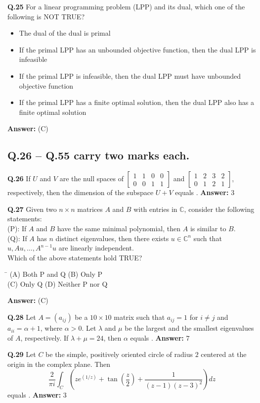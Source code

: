 \documentclass[11pt,a4paper]{article}
\newcommand{\optsfourA}[4]{%
  \begin{tabbing}
    \hspace{0.48\linewidth}\=\kill
    (A) #1 \> (B) #2 \\[2pt]
    (C) #3 \> (D) #4
  \end{tabbing}%
}
\newcommand{\optslistA}[4]{%
  \begin{itemize}
    \setlength{\itemsep}{2pt}\setlength{\parskip}{0pt}
    \item[(A)] #1
    \item[(B)] #2
    \item[(C)] #3
    \item[(D)] #4
  \end{itemize}%
}
\newcommand{\ans}[1]{\textbf{Answer:} #1\par\medskip}
\begin{document}
\textbf{Q.25} For a linear programming problem (LPP) and its dual, which one of the following is NOT TRUE?
\optslistA{The dual of the dual is primal}{If the primal LPP has an unbounded objective function, then the dual LPP is infeasible}{If the primal LPP is infeasible, then the dual LPP must have unbounded objective function}{If the primal LPP has a finite optimal solution, then the dual LPP also has a finite optimal solution}
\ans{(C)}

\subsection*{Q.26 -- Q.55 carry two marks each.}

\textbf{Q.26} If $U$ and $V$ are the null spaces of $\begin{bmatrix} 1 & 1 & 0 & 0 \\ 0 & 0 & 1 & 1 \end{bmatrix}$ and $\begin{bmatrix} 1 & 2 & 3 & 2 \\ 0 & 1 & 2 & 1 \end{bmatrix}$, respectively, then the dimension of the subspace $U + V$ equals \underline{\hspace{2cm}}.
\ans{$3$}

\textbf{Q.27} Given two $n \times n$ matrices $A$ and $B$ with entries in $\mathbb{C}$, consider the following statements:\\
(P): If $A$ and $B$ have the same minimal polynomial, then $A$ is similar to $B$.\\
(Q): If $A$ has $n$ distinct eigenvalues, then there exists $u \in \mathbb{C}^n$ such that $u, Au, \dots, A^{n-1}u$ are linearly independent.\\
Which of the above statements hold TRUE?
\optsfourA{Both P and Q}{Only P}{Only Q}{Neither P nor Q}
\ans{(C)}

\textbf{Q.28} Let $A = (a_{ij})$ be a $10 \times 10$ matrix such that $a_{ij} = 1$ for $i \neq j$ and $a_{ii} = \alpha + 1$, where $\alpha > 0$. Let $\lambda$ and $\mu$ be the largest and the smallest eigenvalues of $A$, respectively. If $\lambda + \mu = 24$, then $\alpha$ equals \underline{\hspace{2cm}}.
\ans{$7$}

\textbf{Q.29} Let $C$ be the simple, positively oriented circle of radius $2$ centered at the origin in the complex plane. Then
\[
  \frac{2}{\pi i} \int_C \left(z e^{(1/z)} + \tan\!\left(\frac{z}{2}\right) + \frac{1}{(z - 1)(z - 3)^2}\right) dz
\]
equals \underline{\hspace{2cm}}.
\ans{$3$}
\end{document}
